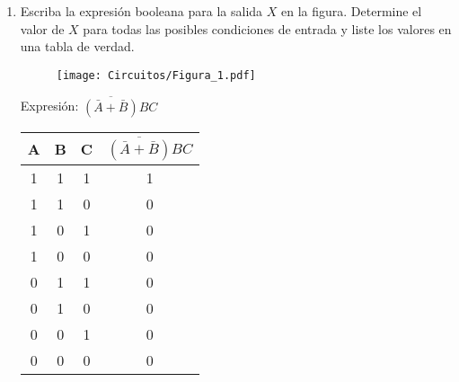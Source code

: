 \documentclass[a4paper, 12pt]{article}
\newcommand{\Aspace}{0.2cm}
\begin{document}
    \begin{enumerate}
        \item Escriba la expresión booleana para la salida $X$ en la figura. Determine el valor de $X$ para todas las posibles condiciones de entrada y liste los valores en una tabla de verdad. \par
        \begin{figure}[!ht]
            \centering
            \texttt{[image: Circuitos/Figura\_1.pdf]}
        \end{figure}
            \vspace{\Aspace} \par
            {   \color{azul} Expresión: $\overline{(\bar{A}+\bar{B})}BC$ \par \vspace{0.5cm}
                \begin{tabular}{c|c|c|c}
                    \textbf{A}  &   \textbf{B}  &   \textbf{C}  &   $\overline{(\bar{A}+\bar{B})}BC$    \\ \hline
                    1           &   1           &   1           &   1                                   \\
                    1           &   1           &   0           &   0                                   \\
                    1           &   0           &   1           &   0                                   \\
                    1           &   0           &   0           &   0                                   \\
                    0           &   1           &   1           &   0                                   \\
                    0           &   1           &   0           &   0                                   \\
                    0           &   0           &   1           &   0                                   \\
                    0           &   0           &   0           &   0                                   \\
                \end{tabular}
            }



\end{enumerate}
\end{document}
